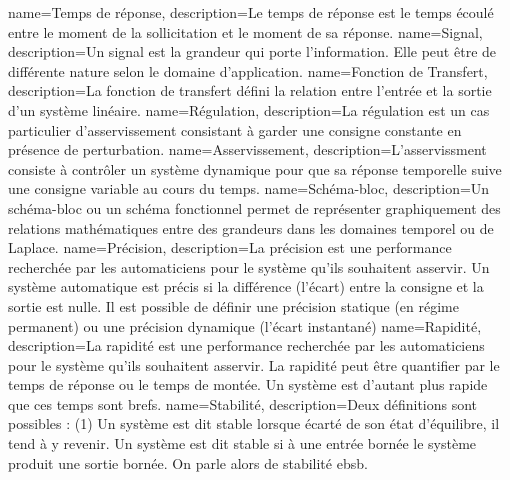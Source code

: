 %
{%
  name={Temps de réponse},%
  description={Le temps de réponse est le temps écoulé entre le moment de 
  la sollicitation et le moment de sa réponse.
  }
}
%
{%
  name={Signal},%
  description={Un signal est la grandeur qui porte l'information. Elle peut être
  de différente nature selon le domaine d'application.
  }
}
%
{%
  name={Fonction de Transfert},%
  description={La fonction de transfert défini la relation
  entre l'entrée et la sortie d'un système linéaire.
  }
}
%
{%
  name={Régulation},%
  description={La régulation est un cas particulier d'asservissement 
  consistant à garder une consigne constante en présence de perturbation.}
}
%
{%
  name={Asservissement},%
  description={L'asservissment consiste à contrôler un système dynamique
  pour que sa réponse temporelle suive une consigne variable au cours du 
  temps.
  }
}
%
{%
  name={Schéma-bloc},%
  description={Un schéma-bloc ou un schéma fonctionnel permet de 
  représenter graphiquement des relations mathématiques entre des grandeurs
  dans les domaines temporel ou de Laplace.
  }
}
%
{%
  name={Précision},%
  description={La précision est une performance recherchée par les automaticiens
  pour le système qu'ils souhaitent asservir. 
  Un système automatique est précis si la différence (l'écart) entre la 
  consigne et la sortie est nulle. Il est possible de définir une précision 
  statique (en régime permanent) ou une précision dynamique (l'écart instantané)
  }
}
%
{%
  name={Rapidité},%
  description={La rapidité est une performance recherchée par les automaticiens 
  pour le système qu'ils souhaitent asservir. 
  La rapidité peut être quantifier par le temps de réponse 
  ou le temps de montée. Un système est d'autant plus rapide que ces temps sont
  brefs.
  }
}
%
{%
  name={Stabilité},%
  description={Deux définitions sont possibles : (1) 
  Un système est dit stable lorsque écarté de son état d'équilibre, 
  il tend à y revenir. Un système est dit stable si à une entrée bornée 
  le système produit une sortie bornée. On parle alors de stabilité \gls{ebsb}.
  }
}
